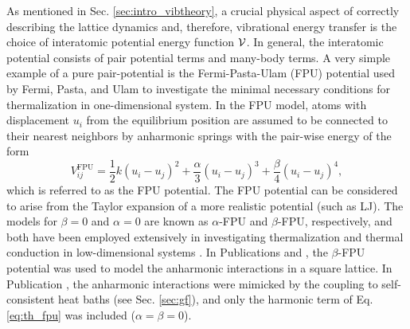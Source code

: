 As mentioned in Sec. \ref{sec:intro_vibtheory}, a crucial physical aspect of correctly describing the lattice dynamics and, therefore, vibrational energy transfer is the choice of interatomic potential energy function $\mathcal{V}$. In general, the interatomic potential consists of pair potential terms and many-body terms. 
A very simple example of a pure pair-potential is the Fermi-Pasta-Ulam (FPU) potential used by Fermi, Pasta, and Ulam to investigate the minimal necessary conditions for thermalization in one-dimensional system. In the FPU model, atoms with displacement $u_i$ from the equilibrium position are assumed to be connected to their nearest neighbors by anharmonic springs with the pair-wise energy of the form
\begin{equation}
  V_{ij}^{\textrm{FPU}} = \frac{1}{2} k (u_i-u_j)^2 + \frac{\alpha}{3} (u_i-u_j)^3+ \frac{\beta}{4} (u_i-u_j)^4, \label{eq:th_fpu}
\end{equation}
which is referred to as the FPU potential. The FPU potential can be considered to arise from the Taylor expansion of a more realistic potential (such as LJ). The models for $\beta=0$ and $\alpha=0$ are known as $\alpha$-FPU and $\beta$-FPU, respectively, and both have been employed extensively in investigating thermalization and thermal conduction in low-dimensional systems \cite{}. In Publications  and , the $\beta$-FPU potential was used to model the anharmonic interactions in a square lattice. In Publication , the anharmonic interactions were mimicked by the coupling to self-consistent heat baths (see Sec. \ref{sec:gf}), and only the harmonic term of Eq. \eqref{eq:th_fpu} was included ($\alpha=\beta=0$).

